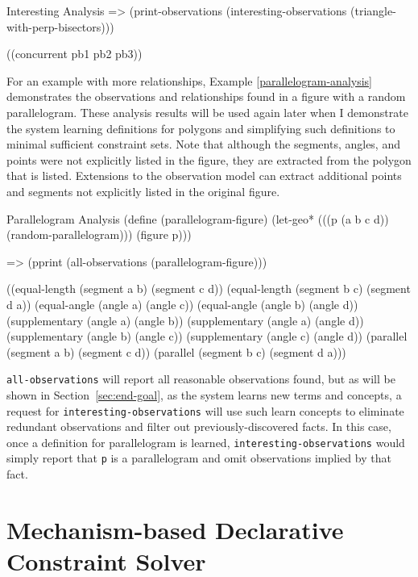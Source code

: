 \begin{repl-example}
[label=interesting-analysis]
{Interesting Analysis}
=> (print-observations (interesting-observations
                         (triangle-with-perp-bisectors)))

((concurrent pb1 pb2 pb3))
\end{repl-example}

For an example with more relationships, Example
\ref{parallelogram-analysis} demonstrates the observations and
relationships found in a figure with a random parallelogram. These
analysis results will be used again later when I demonstrate the
system learning definitions for polygons and simplifying such
definitions to minimal sufficient constraint sets. Note that although
the segments, angles, and points were not explicitly listed in the
figure, they are extracted from the polygon that is listed. Extensions
to the observation model can extract additional points and segments
not explicitly listed in the original figure.

\begin{repl-example}
[label=parallelogram-analysis]
{Parallelogram Analysis}
(define (parallelogram-figure)
  (let-geo* (((p (a b c d)) (random-parallelogram)))
    (figure p)))

=> (pprint (all-observations (parallelogram-figure)))

((equal-length (segment a b) (segment c d))
 (equal-length (segment b c) (segment d a))
 (equal-angle (angle a) (angle c))
 (equal-angle (angle b) (angle d))
 (supplementary (angle a) (angle b))
 (supplementary (angle a) (angle d))
 (supplementary (angle b) (angle c))
 (supplementary (angle c) (angle d))
 (parallel (segment a b) (segment c d))
 (parallel (segment b c) (segment d a)))
\end{repl-example}

\texttt{all-observations} will report all reasonable observations
found, but as will be shown in Section~\ref{sec:end-goal}, as the
system learns new terms and concepts, a request for
\texttt{interesting-observations} will use such learn concepts to
eliminate redundant observations and filter out previously-discovered
facts. In this case, once a definition for parallelogram is learned,
\texttt{interesting-observations} would simply report that \texttt{p}
is a parallelogram and omit observations implied by that fact.


\section{Mechanism-based Declarative Constraint Solver}


